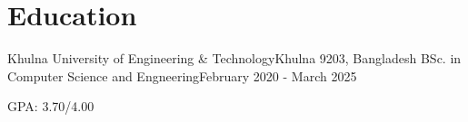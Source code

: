 \section{\textbf{Education}}

\resumeSubHeadingListStart

\resumeSubheading
{Khulna University of Engineering \& Technology}{Khulna 9203, Bangladesh}
{BSc. in Computer Science and Engneering}{February 2020 - March 2025}
\resumeItemListStart
\item GPA: 3.70/4.00
\resumeItemListEnd



\resumeSubHeadingListEnd
\vspace{-5mm}